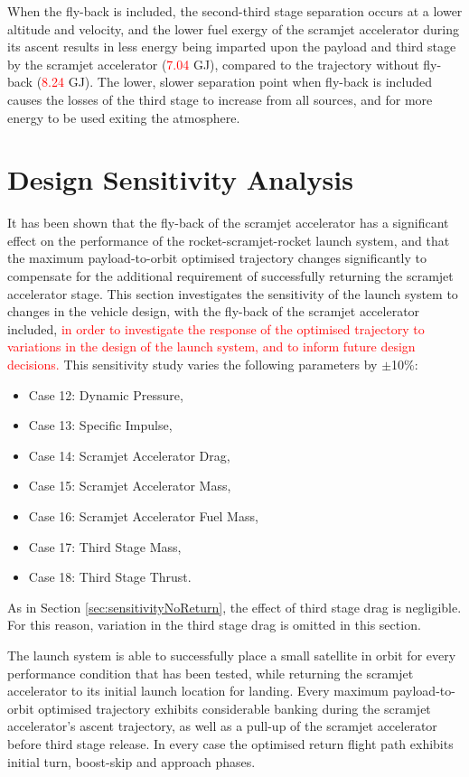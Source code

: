When the fly-back is included, the second-third stage separation occurs at a lower altitude and velocity, and the lower fuel exergy of the scramjet accelerator during its ascent results in less energy being imparted upon the payload and third stage by the scramjet accelerator (\textcolor{red}{7.04} GJ), compared to the trajectory without fly-back (\textcolor{red}{8.24} GJ). 
The lower, slower separation point when fly-back is included causes the losses of the third stage to increase from all sources, and for more energy to be used exiting the atmosphere. 


\section{Design Sensitivity Analysis}\label{sec:sensitivity}

It has been shown that the fly-back of the scramjet accelerator has a significant effect on the performance of the rocket-scramjet-rocket launch system, and that the maximum payload-to-orbit optimised trajectory changes significantly to compensate for the additional requirement of successfully returning the scramjet accelerator stage. This section investigates the sensitivity of the launch system to changes in the vehicle design, with the fly-back of the scramjet accelerator included, \textcolor{red}{in order to investigate the response of the optimised trajectory to variations in the design of the launch system, and to inform future design decisions.} This sensitivity study varies the following parameters by $\pm$10\%:
\begin{itemize}
	\item Case 12: Dynamic Pressure, 
	\item Case 13: Specific Impulse,
	\item Case 14: Scramjet Accelerator Drag,
	\item Case 15: Scramjet Accelerator Mass,
	\item Case 16: Scramjet Accelerator Fuel Mass,
	\item Case 17: Third Stage Mass,
	\item Case 18: Third Stage Thrust.
\end{itemize}
As in Section \ref{sec:sensitivityNoReturn}, the effect of third stage drag is negligible. For this reason, variation in the third stage drag is omitted in this section. 

The launch system is able to successfully place a small satellite in orbit for every performance condition that has been tested, while returning the scramjet accelerator to its initial launch location for landing. 
Every maximum payload-to-orbit optimised trajectory exhibits considerable banking during the scramjet accelerator's ascent trajectory, as well as a pull-up of the scramjet accelerator before third stage release. 
In every case the optimised return flight path exhibits initial turn, boost-skip and approach phases. 




